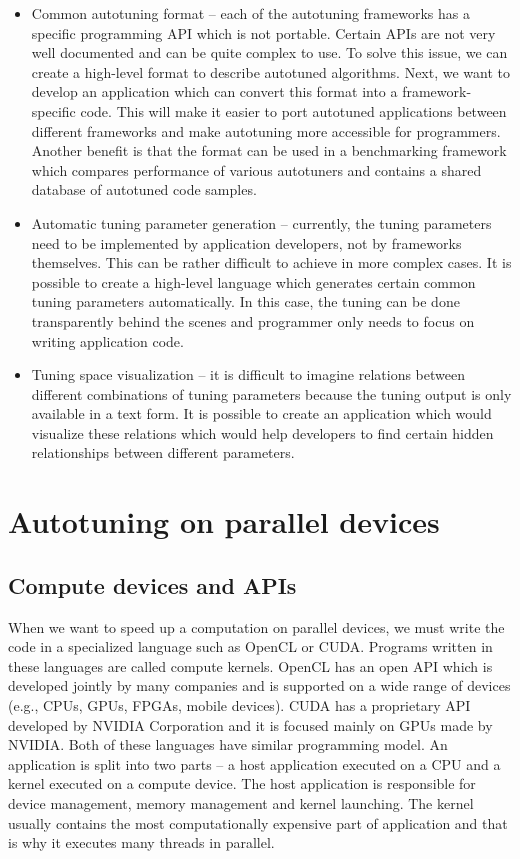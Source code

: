 \documentclass[
  digital,     %
  oneside,     %
  nosansbold,  %
  nocolorbold, %
  lof,         %
  lot,         %
  nocover
]{fithesis4}
\begin{document}
\begin{itemize}
    \item Common autotuning format -- each of the autotuning frameworks has a specific programming API which is not portable. Certain APIs are not very well documented and can be quite complex to use. To solve this issue, we can create a high-level format to describe autotuned algorithms. Next, we want to develop an application which can convert this format into a framework-specific code. This will make it easier to port autotuned applications between different frameworks and make autotuning more accessible for programmers. Another benefit is that the format can be used in a benchmarking framework which compares performance of various autotuners and contains a shared database of autotuned code samples.
    \item Automatic tuning parameter generation -- currently, the tuning parameters need to be implemented by application developers, not by frameworks themselves. This can be rather difficult to achieve in more complex cases. It is possible to create a high-level language which generates certain common tuning parameters automatically. In this case, the tuning can be done transparently behind the scenes and programmer only needs to focus on writing application code.
    \item Tuning space visualization -- it is difficult to imagine relations between different combinations of tuning parameters because the tuning output is only available in a text form. It is possible to create an application which would visualize these relations which would help developers to find certain hidden relationships between different parameters.
\end{itemize}

\chapter{Autotuning on parallel devices}

\section{Compute devices and APIs}
When we want to speed up a computation on parallel devices, we must write the code in a specialized language such as OpenCL or CUDA. Programs written in these languages are called compute kernels. OpenCL has an open API which is developed jointly by many companies and is supported on a wide range of devices (e.g., CPUs, GPUs, FPGAs, mobile devices). CUDA has a proprietary API developed by NVIDIA Corporation and it is focused mainly on GPUs made by NVIDIA. Both of these languages have similar programming model. An application is split into two parts -- a host application executed on a CPU and a kernel executed on a compute device. The host application is responsible for device management, memory management and kernel launching. The kernel usually contains the most computationally expensive part of application and that is why it executes many threads in parallel.
\end{document}
